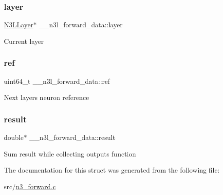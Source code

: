 \subsubsection{\texorpdfstring{layer}{layer}}
{\footnotesize\ttfamily \mbox{\hyperlink{struct__n3l__layer}{N3\+L\+Layer}}$\ast$ \+\_\+\+\_\+n3l\+\_\+forward\+\_\+data\+::layer}

Current layer \mbox{\label{struct____n3l__forward__data_ada78b9bd1418f8dccab76319afb7d64b}} 
\subsubsection{\texorpdfstring{ref}{ref}}
{\footnotesize\ttfamily uint64\+\_\+t \+\_\+\+\_\+n3l\+\_\+forward\+\_\+data\+::ref}

Next layer\textquotesingle{}s neuron reference \mbox{\label{struct____n3l__forward__data_ac870eae5ce14b297b5d78cc7112c8cec}} 
\subsubsection{\texorpdfstring{result}{result}}
{\footnotesize\ttfamily double$\ast$ \+\_\+\+\_\+n3l\+\_\+forward\+\_\+data\+::result}

Sum result while collecting outputs function 

The documentation for this struct was generated from the following file\+:\begin{DoxyCompactItemize}
\item 
src/\mbox{\hyperlink{n3__forward_8c}{n3\+\_\+forward.\+c}}\end{DoxyCompactItemize}
